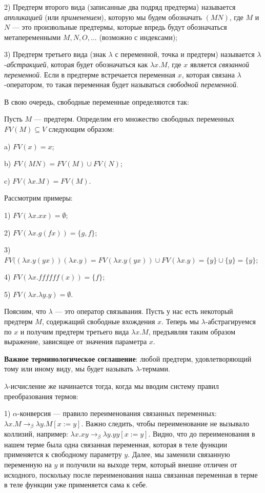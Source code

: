 \documentclass[a4paper]{article}
\begin{document}
2) Предтерм второго вида (записанные два подряд предтерма) называется \emph{аппликацией} (или \emph{применением}), которую мы будем обозначать $(M N)$, где
$M$ и $N$ --- это произвольные предтермы, которые впредь будут обозначаться метапеременными $M, N, O,...$ (возможно с индексами);

3) Предтерм третьего вида (знак $\lambda$ с переменной, точка и предтерм) называется $\lambda$-\emph{абстракцией}, которая будет обозначаться как $\lambda x.M$,
где $x$ является \emph{связанной переменной}. Если в предтерме встречается переменная $x$, которая связана $\lambda$-оператором,
то такая переменная будет называться \emph{свободной переменной}.

В свою очередь, свободные переменные определяются так:

Пусть $M$ --- предтерм. Определим его множество свободных переменных $FV(M) \subseteq V$ следующим образом:

a) $FV(x) = {x}$;

b) $FV(M N) = FV(M) \cup FV(N)$;

c) $FV(\lambda x. M) = FV(M)$.

Рассмотрим примеры:

1) $FV(\lambda x. xx) = \emptyset$;

2) $FV(\lambda x. g(f x)) = \{g, f\}$;

3) $FV((\lambda x. y(yx))(\lambda x.y) = FV(\lambda x. y(yx)) \cup FV(\lambda x.y) = \{ y \} \cup \{ y\} = \{ y\}$;

4) $FV(\lambda x. ffffff(x)) = \{ f \}$;

5) $FV(\lambda x. \lambda y. y) = \emptyset$.

Поясним, что $\lambda$ --- это оператор связывания. Пусть у нас есть некоторый предтерм $M$, содержащий свободные вхождения $x$. Теперь мы $\lambda$-абстрагируемся
по $x$ и получим предтерм третьего вида $\lambda x. M$, предъявляя таким образом выражение, зависящее от значения параметра $x$.

\textbf{Важное терминологическое соглашение}: любой предтерм, удовлетворяющий тому или иному виду, мы будет называть $\lambda$-термами.

$\lambda$-исчисление же начинается тогда, когда мы вводим систему правил преобразования термов:

1) $\alpha$-конверсия --- правило переименования связанных переменных: $\lambda x.M \rightarrow_{\beta} \lambda y.M[x := y]$.
Важно следить, чтобы переименование не вызывало коллизий, например: $\lambda x. xy \rightarrow_{\beta} \lambda y.yy[x := y]$. Видно,
что до переименования в нашем терме была одна связанная переменная, которая в теле функции применяется к свободному параметру $y$.
Далее, мы заменили связанную переменную на $y$ и получили на выходе терм, который внешне отличен от исходного, поскольку после переименования
наша связанная переменная в терме в теле функции уже применяется сама к себе.
\end{document}
